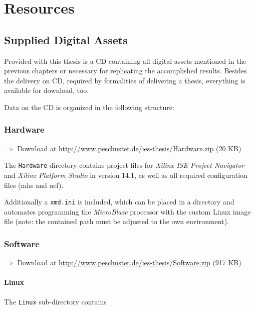 \chapter{Resources}

\section{Supplied Digital Assets}

Provided with this thesis is a CD containing all digital assets mentioned in the previous chapters or necessary for replicating the accomplished results. Besides the delivery on CD, required by formalities of delivering a thesis, everything is available for download, too.

Data on the CD is organized in the following structure:

\subsection{Hardware}
$\Rightarrow$ Download at \url{http://www.peschuster.de/ies-thesis/Hardware.zip} (20 KB)

The \texttt{Hardware} directory contains project files for \textit{Xilinx ISE Project Navigator} and \textit{Xilinx Platform Studio} in version 14.1, as well as all required configuration files (mhs and ucf).

Additionally a \texttt{xmd.ini} is included, which can be placed in a directory and automates programming the \textit{MicroBlaze} processor with the custom Linux image file (note: the contained path must be adjusted to the own environment).
\\

\subsection{Software}
$\Rightarrow$ Download at \url{http://www.peschuster.de/ies-thesis/Software.zip} (917 KB)

\subsubsection{Linux}
\label{subsec:pvr_patch}

The \texttt{Linux} sub-directory contains 

